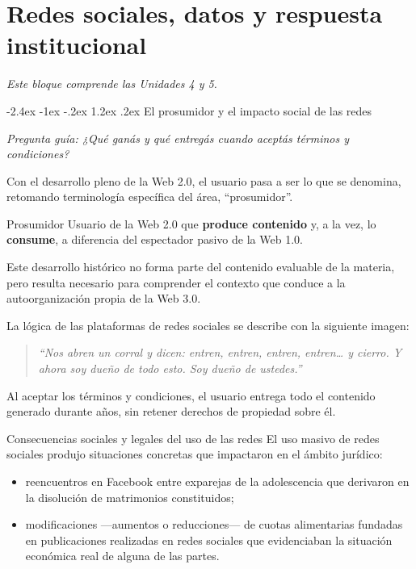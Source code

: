 \documentclass[12pt,oneside]{book}
\makeatletter
\renewcommand\section{\@startsection{section}{1}{\z@}%
  {-2.4ex \@plus -1ex \@minus -.2ex}%
  {1.2ex \@plus .2ex}%
  {\normalfont\Large\bfseries\color{blue!50!black}}}
\newcommand{\guia}[1]{\noindent\textit{Pregunta guía: #1}\par\smallskip}
\newcommand{\alcance}[1]{\noindent\textit{#1}\par\smallskip}
\makeatother
\begin{document}
\chapter[Redes sociales y respuesta institucional]{Redes sociales, datos y respuesta institucional}

\alcance{Este bloque comprende las Unidades 4 y 5.}

\section{El prosumidor y el impacto social de las redes}

\guia{¿Qué ganás y qué entregás cuando aceptás términos y condiciones?}

Con el desarrollo pleno de la Web 2.0, el usuario pasa a ser lo que se denomina, retomando terminología específica del área, ``prosumidor''.

\begin{definition}{Prosumidor}
Usuario de la Web 2.0 que \textbf{produce contenido} y, a la vez, lo \textbf{consume}, a diferencia del espectador pasivo de la Web 1.0.
\end{definition}

\begin{note}
Este desarrollo histórico no forma parte del contenido evaluable de la materia, pero resulta necesario para comprender el contexto que conduce a la autoorganización propia de la Web 3.0.
\end{note}

La lógica de las plataformas de redes sociales se describe con la siguiente imagen:

\begin{quote}
\textit{``Nos abren un corral y dicen: entren, entren, entren, entren\ldots{} y cierro. Y ahora soy dueño de todo esto. Soy dueño de ustedes.''}
\end{quote}

Al aceptar los términos y condiciones, el usuario entrega todo el contenido generado durante años, sin retener derechos de propiedad sobre él.

\begin{example}{Consecuencias sociales y legales del uso de las redes}
El uso masivo de redes sociales produjo situaciones concretas que impactaron en el ámbito jurídico:
\begin{itemize}
    \item reencuentros en Facebook entre exparejas de la adolescencia que derivaron en la disolución de matrimonios constituidos;
    \item modificaciones ---aumentos o reducciones--- de cuotas alimentarias fundadas en publicaciones realizadas en redes sociales que evidenciaban la situación económica real de alguna de las partes.
\end{itemize}
\end{example}
\end{document}
